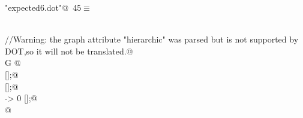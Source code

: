 \documentclass[a4paper]{report}
\begin{document}
\begin{flushleft} \small
\begin{minipage}{\linewidth}\label{scrap45}\raggedright\small
{} \verb@"expected6.dot"@\nobreak\ {\footnotesize {45}}$\equiv$
\vspace{-1ex}
\begin{list}{}{} \item
\mbox{}\verb@@\\
\mbox{}\verb@//Warning: the graph attribute "hierarchic" was parsed but is not supported by DOT,so it will not be translated.@\\
\mbox{}\verb@digraph G {@\\
\mbox{} [];@\\
\mbox{} [];@\\
\mbox{} -> 0 [];@\\
\mbox{}\verb@}@\\
\mbox{}\verb@@{\NWsep}
\end{list}
\vspace{-1.5ex}
\footnotesize
\begin{list}{}{\setlength{\itemsep}{-\parsep}\setlength{\itemindent}{-\leftmargin}}

\item{}
\end{list}
\end{minipage}\vspace{4ex}
\end{flushleft}
\newpage
\end{document}
